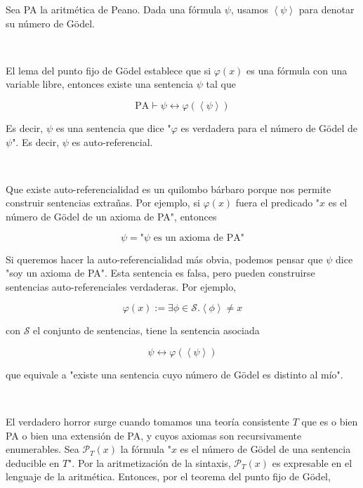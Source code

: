\documentclass[a4paper, 12pt]{article}
\begin{document}
Sea PA la aritmética de Peano. Dada una fórmula $\psi$, usamos $\left<\psi
\right>$ para denotar su número de Gödel.

~

El lema del punto fijo de Gödel establece que si $\varphi(x)$ es una fórmula con
una variable libre, entonces existe una sentencia $\psi$ tal que 

\begin{equation*}
  \text{PA} \vdash \psi \leftrightarrow \varphi( \left< \psi \right> )
\end{equation*}

Es decir, $\psi$ es una sentencia que dice "$\varphi$ es verdadera para el
número de Gödel de $\psi$". Es decir, $\psi$ es auto-referencial.

~ 

Que existe auto-referencialidad es un quilombo bárbaro porque nos permite
construir sentencias extrañas. Por ejemplo, si $\varphi(x)$ fuera el predicado 
"$x$ es el número de Gödel de un axioma de PA", entonces

\begin{equation*}
  \psi = \text{"$\psi$ es un axioma de PA"}
\end{equation*}

Si queremos hacer la auto-referencialidad más obvia, podemos pensar que $\psi$
dice "soy un axioma de PA". Esta sentencia es falsa, pero pueden construirse
sentencias auto-referenciales verdaderas. Por ejemplo, 

\begin{equation*}
  \varphi(x) := \exists \phi \in \mathcal{S} . \left< \phi \right> \neq x
\end{equation*}

con $\mathcal{S}$ el conjunto de sentencias, tiene la sentencia asociada 

\begin{equation*}
  \psi \leftrightarrow \varphi(\left< \psi \right>)
\end{equation*}

que equivale a "existe una sentencia cuyo número de Gödel es distinto al mío".

~ 

El verdadero horror surge cuando tomamos una teoría consistente $T$ que es o
bien PA o bien una extensión de PA, y cuyos axiomas son recursivamente
enumerables. Sea $\mathcal{P}_T(x)$ la fórmula "$x$ es el número de Gödel de una
sentencia deducible en $T$". Por la aritmetización de la sintaxis,
$\mathcal{P}_T(x)$ es expresable en el lenguaje de la aritmética. Entonces, por
el teorema del punto fijo de Gödel,
\end{document}
